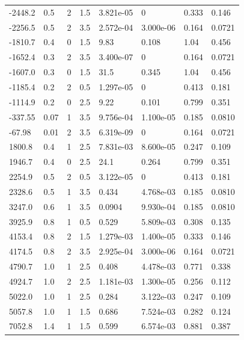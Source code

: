 \documentclass[preview]{standalone}
\begin{document}
{{\begin{tabular}{L{1.2cm}C{1.2cm} C{0.3cm}C{0.5cm} C{1.4cm}C{1.4cm} C{1.4cm}C{1.4cm}}
  -2448.2  &   0.5  & 2     & 1.5 &  3.821e-05  & 0  & 0.333 &  0.146   \\ 
  -2256.5  &   0.5  & 2     & 3.5 &  2.572e-04  & 3.000e-06  & 0.164 &  0.0721   \\ 
  -1810.7  &   0.4  & 0     & 1.5 &  9.83  & 0.108  & 1.04 &  0.456   \\ 
  -1652.4  &   0.3  & 2     & 3.5 &  3.400e-07  & 0  & 0.164 &  0.0721   \\ 
  -1607.0  &   0.3  & 0     & 1.5 &  31.5  & 0.345  & 1.04 &  0.456   \\ 
  -1185.4  &   0.2  & 2     & 0.5 &  1.297e-05  & 0  & 0.413 &  0.181   \\ 
  -1114.9  &   0.2  & 0     & 2.5 &  9.22  & 0.101  & 0.799 &  0.351   \\ 
  -337.55  &  0.07  & 1     & 3.5 &  9.756e-04  & 1.100e-05  & 0.185 &  0.0810   \\ 
  -67.98  &  0.01  & 2     & 3.5 &  6.319e-09  & 0  & 0.164 &  0.0721   \\ 
  1800.8  &   0.4  & 1     & 2.5 &  7.831e-03  & 8.600e-05  & 0.247 &  0.109   \\ 
  1946.7  &   0.4  & 0     & 2.5 &  24.1  & 0.264  & 0.799 &  0.351   \\ 
  2254.9  &   0.5  & 2     & 0.5 &  3.122e-05  & 0  & 0.413 &  0.181   \\ 
  2328.6  &   0.5  & 1     & 3.5 &  0.434  & 4.768e-03  & 0.185 &  0.0810   \\ 
  3247.0  &   0.6  & 1     & 3.5 &  0.0904  & 9.930e-04  & 0.185 &  0.0810   \\ 
  3925.9  &   0.8  & 1     & 0.5 &  0.529  & 5.809e-03  & 0.308 &  0.135   \\ 
  4153.4  &   0.8  & 2     & 1.5 &  1.279e-03  & 1.400e-05  & 0.333 &  0.146   \\ 
  4174.5  &   0.8  & 2     & 3.5 &  2.925e-04  & 3.000e-06  & 0.164 &  0.0721   \\ 
  4790.7  &   1.0  & 1     & 2.5 &  0.408  & 4.478e-03  & 0.771 &  0.338   \\ 
  4924.7  &   1.0  & 2     & 2.5 &  1.181e-03  & 1.300e-05  & 0.256 &  0.112   \\ 
  5022.0  &   1.0  & 1     & 2.5 &  0.284  & 3.122e-03  & 0.247 &  0.109   \\ 
  5057.8  &   1.0  & 1     & 1.5 &  0.686  & 7.524e-03  & 0.282 &  0.124   \\ 
  7052.8  &   1.4  & 1     & 1.5 &  0.599  & 6.574e-03  & 0.881 &  0.387   \\ 

\end{tabular}}}
\end{document}
